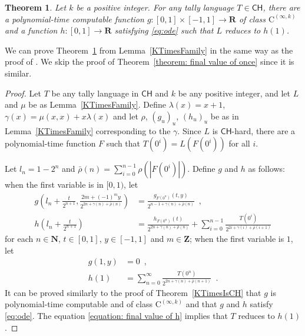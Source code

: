 \documentclass[12pt,a4paper]{article}
\newtheorem{theorem}{Theorem}%
\theoremstyle{definition}
\theoremstyle{remark}
\newcommand{\R}{\mathbf R}
\newcommand{\N}{\mathbf N}
\newcommand{\Z}{\mathbf Z}
\newcommand{\classCH}{\mathsf{CH}}
\newcommand{\classC}{\mathrm C}
\begin{document}
\begin{theorem}
\label{theorem: final value of fixed}
Let $k$ be a positive integer. 
For any tally language $T \in \classCH$,
there are a polynomial-time computable function
$g \colon [0,1] \times [-1,1] \to \R$ 
of class $\classC ^{(\infty, k)}$ and 
a function $h \colon [0,1] \to \R$
satisfying \eqref{eq:ode} 
such that $L$ reduces to $h(1)$.
\end{theorem}

We can prove Theorem~\ref{theorem: final value of fixed} 
from Lemma~\ref{KTimesFamily}
in the same way as the proof of \cite[Theorem~5.1]{kawamura2010complexity}.
We skip the proof of Theorem~\ref{theorem: final value of once}
since it is similar.

\begin{proof}
Let $T$ be any tally language in $\classCH$ and $k$ be any positive integer,
and let $L$ and $\mu$ be as Lemma~\ref{KTimesFamily}.
Define $
\lambda(x) = x + 1
$, $
\gamma(x) = \mu(x, x) + x \lambda(x)
$ and let $\rho$, $(g_u)_u$, $(h_u)_u$ be  as in Lemma~\ref{KTimesFamily} 
corresponding to the $\gamma$.
Since $L$ is $\classCH$-hard,
there are a polynomial-time function $F$ such that 
$T (0 ^i) =  L(F(0 ^i))$ for all $i$. 

Let $
l_n = 1 - 2^n
$ and $
\bar{\rho}(n) = \sum^{n-1}_{i = 0} \rho(|F(0 ^i)|)
$.  Define $g$ and $h$ as follows: 
when the first variable is in $[0,1)$, let
\begin{align}
 g \left(l_n + \frac{t}{2^{n+1}}, \frac{2m+(-1)^m y}{2^{2n+\gamma(n)+\bar{\rho}(n)}} \right)
 &=
 \frac{g_{F(0^n)}(t, y)}{2^{n-1+\gamma(n)+\bar{\rho}(n)}} \enspace ,
 \\
 h \left( l_n + \frac{t}{2^{n+1}} \right)
 &=
 \frac{h_{F(0^n)}(t)}{2^{2n+\gamma(n)+\bar{\rho}(n)}}
 + \sum^{n-1}_{i = 0} \frac{T (0^i)}{2^{2 i + \gamma (i) + \bar{\rho} (i + 1)}}
\end{align}
for each $n \in \N$, $t \in [0,1]$, $y \in [-1, 1]$ and $m \in \Z$; 
when the first variable is $1$,
let 
\begin{align} 
  g(1, y) 
&
 =
  0 \enspace, 
\\
\label{equation: final value of h}
  h(1) 
&
 = 
 \sum^\infty_{n = 0} \frac{T (0^n)}{2^{2n+\gamma(n)+\bar{\rho}(n+1)}} \enspace. 
\end{align}
It can be proved similarly to the proof of Theorem~\ref{KTimesIsCH} 
that $g$ is polynomial-time computable and of class $\classC ^{(\infty, k)}$
and that $g$ and $h$ satisfy \eqref{eq:ode}.
The equation \eqref{equation: final value of h} implies 
that $T$ reduces to $h(1)$. 
\end{proof}
\end{document}
